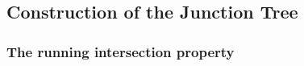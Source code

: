 \subsection{Construction of the Junction Tree}\label{sec:constructjt}

\begin{frame} 
\end{frame}

\subsubsection{The running intersection property}

